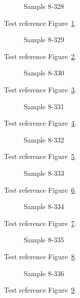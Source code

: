\begin{figure}[tbhp]
\caption{Sample 8-328}
\label{fig:sample-8-328}
\end{figure}

Test reference Figure~\ref{fig:sample-8-328}.

\begin{figure}[tbhp]
\caption{Sample 8-329}
\label{fig:sample-8-329}
\end{figure}

Test reference Figure~\ref{fig:sample-8-329}.

\begin{figure}[tbhp]
\caption{Sample 8-330}
\label{fig:sample-8-330}
\end{figure}

Test reference Figure~\ref{fig:sample-8-330}.

\begin{figure}[tbhp]
\caption{Sample 8-331}
\label{fig:sample-8-331}
\end{figure}

Test reference Figure~\ref{fig:sample-8-331}.

\begin{figure}[tbhp]
\caption{Sample 8-332}
\label{fig:sample-8-332}
\end{figure}

Test reference Figure~\ref{fig:sample-8-332}.

\begin{figure}[tbhp]
\caption{Sample 8-333}
\label{fig:sample-8-333}
\end{figure}

Test reference Figure~\ref{fig:sample-8-333}.

\begin{figure}[tbhp]
\caption{Sample 8-334}
\label{fig:sample-8-334}
\end{figure}

Test reference Figure~\ref{fig:sample-8-334}.

\begin{figure}[tbhp]
\caption{Sample 8-335}
\label{fig:sample-8-335}
\end{figure}

Test reference Figure~\ref{fig:sample-8-335}.

\begin{figure}[tbhp]
\caption{Sample 8-336}
\label{fig:sample-8-336}
\end{figure}

Test reference Figure~\ref{fig:sample-8-336}.

